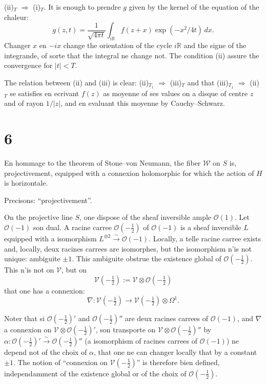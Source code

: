 \documentclass[12pt,a4paper]{article}
\theoremstyle{plain}
\theoremstyle{definition}
\theoremstyle{remark}
\begin{document}
(ii)$_T$ $\Rightarrow$ (i)$_T$. It is enough to prendre $g$ given by the kernel of the equation of the chaleur:
\[g(z, t) = \frac{1}{\sqrt{4\pi t}}\int_{i\mathbb{R}} f(z + x)\exp(-x^2/4t)\,dx.\]
Changer $x$ en $-ix$ change the orientation of the cycle $i\mathbb{R}$ and the signe of the integrande, of sorte that the integral ne change not. The condition (ii) assure the convergence for $|t| < T$.

The relation between (ii) and (iii) is clear: (ii)$_{T_1}$ $\Rightarrow$ (iii)$_T$ and that (iii)$_{T_1}$ $\Rightarrow$ (ii)$_T$ se satisfies en ecrivant $f(z)$ as moyenne of ses values on a disque of centre $z$ and of rayon $1/|z|$, and en evaluant this moyenne by Cauchy--Schwarz.

\section*{6}

En hommage to the theorem of Stone--von Neumann, the fiber $\mathscr{W}$ on $S$ is, projectivement, equipped with a connexion holomorphic for which the action of $H$ is horizontale.

Precisons: ``projectivement''.

On the projective line $S$, one dispose of the sheaf inversible ample $\mathcal{O}(1)$. Let $\mathcal{O}(-1)$ son dual. A racine carree $\mathcal{O}(-\frac{1}{2})$ of $\mathcal{O}(-1)$ is a sheaf inversible $L$ equipped with a isomorphism $L^{\otimes 2} \xrightarrow{\sim} \mathcal{O}(-1)$. Locally, a telle racine carree exists and, locally, deux racines carrees are isomorphes, but the isomorphism n'is not unique: ambiguite $\pm 1$. This ambiguite obstrue the existence global of $\mathcal{O}(-\frac{1}{2})$. This n'is not on $\mathscr{V}$, but on
\begin{equation}\label{eq:6.1}
\mathscr{V}(-\tfrac{1}{2}) := \mathscr{V} \otimes \mathcal{O}(-\tfrac{1}{2})\tag{6.1}
\end{equation}
that one has a connexion:
\[\nabla \colon \mathscr{V}(-\tfrac{1}{2}) \to \mathscr{V}(-\tfrac{1}{2}) \otimes \Omega^1.\]

Noter that si $\mathcal{O}(-\frac{1}{2})'$ and $\mathcal{O}(-\frac{1}{2})''$ are deux racines carrees of $\mathcal{O}(-1)$, and $\nabla$ a connexion on $\mathscr{V} \otimes \mathcal{O}(-\frac{1}{2})'$, son transporte on $\mathscr{V} \otimes \mathcal{O}(-\frac{1}{2})''$ by $\alpha \colon \mathcal{O}(-\frac{1}{2})' \xrightarrow{\sim} \mathcal{O}(-\frac{1}{2})''$ (a isomorphism of racines carrees of $\mathcal{O}(-1)$) ne depend not of the choix of $\alpha$, that one ne can changer locally that by a constant $\pm 1$. The notion of ``connexion on $\mathscr{V}(-\frac{1}{2})$'' is therefore bien defined, independamment of the existence global or of the choix of $\mathcal{O}(-\frac{1}{2})$.
\end{document}
